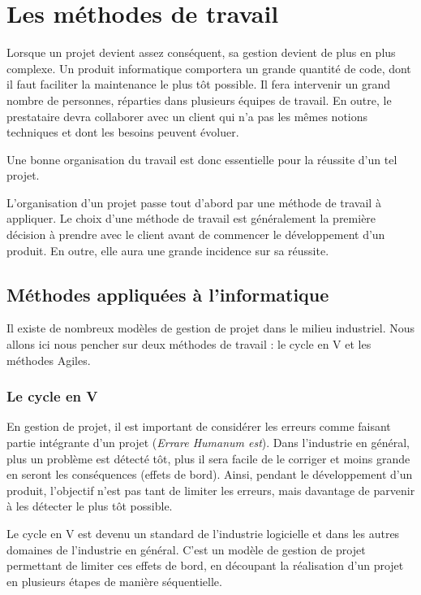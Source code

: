 \chapter{Les méthodes de travail}

Lorsque un projet devient assez conséquent, sa gestion devient de plus en plus complexe. Un produit informatique comportera un grande quantité de code, dont il faut faciliter la maintenance le plus tôt possible. Il fera intervenir un grand nombre de personnes, réparties dans plusieurs équipes de travail.
En outre, le prestataire devra collaborer avec un client qui n'a pas les mêmes notions techniques et dont les besoins peuvent évoluer.

Une bonne organisation du travail est donc essentielle pour la réussite d'un tel projet.

L'organisation d'un projet passe tout d'abord par une méthode de travail à appliquer. Le choix d'une méthode de travail est généralement la première décision à prendre avec le client avant de commencer le développement d'un produit. En outre, elle aura une grande incidence sur sa réussite.

\section{Méthodes appliquées à l'informatique}

Il existe de nombreux modèles de gestion de projet dans le milieu industriel. Nous allons ici nous pencher sur deux méthodes de travail : le cycle en V et les méthodes Agiles.

\subsection{Le cycle en V}

En gestion de projet, il est important de considérer les erreurs comme faisant partie intégrante d'un projet (\textit{Errare Humanum est}). Dans l'industrie en général, plus un problème est détecté tôt, plus il sera facile de le corriger et moins grande en seront les conséquences (effets de bord). Ainsi, pendant le développement d'un produit, l'objectif n'est pas tant de limiter les erreurs, mais davantage de parvenir à les détecter le plus tôt possible.

Le cycle en V est devenu un standard de l'industrie logicielle et dans les autres domaines de l'industrie en général. C'est un modèle de gestion de projet permettant de limiter ces effets de bord, en découpant la réalisation d'un projet en plusieurs étapes de manière séquentielle.

